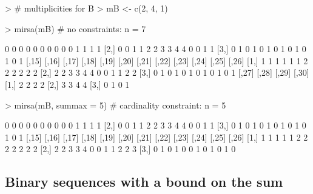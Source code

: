 \documentclass[11pt]{article}
\begin{document}
\begin{Schunk}
\begin{Sinput}
> # multiplicities for B
> mB <- c(2, 4, 1)
\end{Sinput}
\end{Schunk}
\pagebreak %
\begin{Schunk}
\begin{Sinput}
> mirsa(mB)                # no constraints: n = 7
\end{Sinput}
\begin{Soutput}
     [,1] [,2] [,3] [,4] [,5] [,6] [,7] [,8] [,9] [,10] [,11] [,12] [,13] [,14]
[1,]    0    0    0    0    0    0    0    0    0     0     1     1     1     1
[2,]    0    0    1    1    2    2    3    3    4     4     0     0     1     1
[3,]    0    1    0    1    0    1    0    1    0     1     0     1     0     1
     [,15] [,16] [,17] [,18] [,19] [,20] [,21] [,22] [,23] [,24] [,25] [,26]
[1,]     1     1     1     1     1     1     2     2     2     2     2     2
[2,]     2     2     3     3     4     4     0     0     1     1     2     2
[3,]     0     1     0     1     0     1     0     1     0     1     0     1
     [,27] [,28] [,29] [,30]
[1,]     2     2     2     2
[2,]     3     3     4     4
[3,]     0     1     0     1
\end{Soutput}
\begin{Sinput}
> mirsa(mB, summax = 5)    # cardinality constraint: n = 5 
\end{Sinput}
\begin{Soutput}
     [,1] [,2] [,3] [,4] [,5] [,6] [,7] [,8] [,9] [,10] [,11] [,12] [,13] [,14]
[1,]    0    0    0    0    0    0    0    0    0     0     1     1     1     1
[2,]    0    0    1    1    2    2    3    3    4     4     0     0     1     1
[3,]    0    1    0    1    0    1    0    1    0     1     0     1     0     1
     [,15] [,16] [,17] [,18] [,19] [,20] [,21] [,22] [,23] [,24] [,25] [,26]
[1,]     1     1     1     1     1     2     2     2     2     2     2     2
[2,]     2     2     3     3     4     0     0     1     1     2     2     3
[3,]     0     1     0     1     0     0     1     0     1     0     1     0
\end{Soutput}
\end{Schunk}

\subsection{Binary sequences with a bound on the sum} \label{sec:ex3}  
\end{document}
